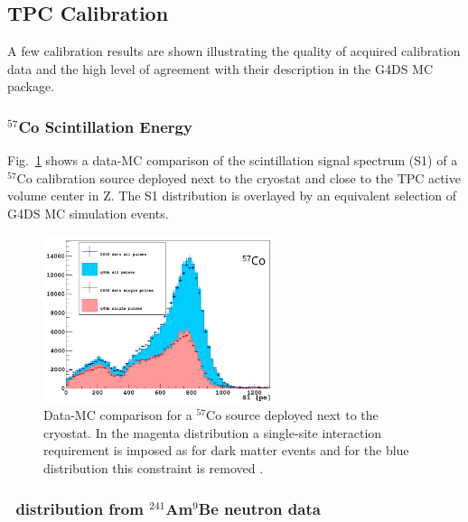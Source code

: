 \subsection{TPC Calibration}
A few calibration results are shown illustrating the quality of acquired calibration data and the high level of agreement with their description in the G4DS MC package.

\subsubsection{$^{57}$Co Scintillation Energy}
Fig.~\ref{fig:CalibData:Co57} shows a data-MC comparison of the scintillation signal spectrum (S1) of a $^{57}$Co calibration source deployed next to the cryostat and close to the TPC active volume center in Z. The S1 distribution is overlayed by an equivalent selection of G4DS MC simulation events.

\begin{figure}[htbp]
\centering
\includegraphics[width=0.6\textwidth]{./Figures/57Co_Paolo_G4DS_UCLA.png}
\caption{Data-MC comparison for a $^{57}$Co source deployed next to the cryostat. In the magenta distribution a single-site interaction requirement is imposed as for dark matter events and for the blue distribution this constraint is removed \cite{DS50:G4DS:paper}.
\label{fig:CalibData:Co57}}
 \end{figure}


\subsubsection{\FNinety\ distribution from $^{241}$Am$^9$Be neutron data}\label{sec:CalibData:NR}

